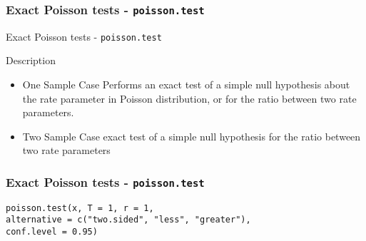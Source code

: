 \documentclass{beamer}
\begin{document}
\begin{frame}[fragile]
	\frametitle{Exact Poisson tests - \texttt{poisson.test}}
	\Large

Exact Poisson tests - \texttt{poisson.test}

Description

\begin{itemize}
\item One Sample Case Performs an exact test of a simple null hypothesis about the rate parameter in Poisson distribution, or for the ratio between two rate parameters.
\item Two Sample Case exact test of a simple null hypothesis for the ratio between two rate parameters
\end{itemize}

\end{frame}
\begin{frame}[fragile]
	\frametitle{Exact Poisson tests - \texttt{poisson.test}}
	\Large
	\begin{framed}
		\begin{verbatim}
poisson.test(x, T = 1, r = 1,
alternative = c("two.sided", "less", "greater"),
conf.level = 0.95)
\end{verbatim}
\end{framed}
\end{frame}
\end{document}
